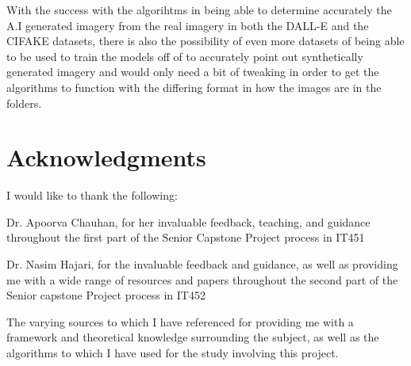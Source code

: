 \documentclass[12pt,letter]{article}
\begin{document}
With the success with the algorihtms in being able to determine accurately the A.I generated imagery from the real imagery in both the DALL-E and the CIFAKE datasets, there is also the possibility of even more datasets of being able to be used to train the models off of to accurately point out synthetically generated imagery and would only need a bit of tweaking in order to get the algorithms to function with the differing format in how the images are in the folders.

\newpage
\section{Acknowledgments} 

I would like to thank the following:

Dr. Apoorva Chauhan, for her invaluable feedback, teaching, and guidance throughout the first part of the Senior Capstone Project process in IT451

Dr. Nasim Hajari, for the invaluable feedback and guidance, as well as providing me with a wide range of resources and papers throughout the second part of the Senior capstone Project process in IT452

The varying sources to which I have referenced for providing me with a framework and theoretical knowledge surrounding the subject, as well as the algorithms to which I have used for the study involving this project. 
\end{document}

